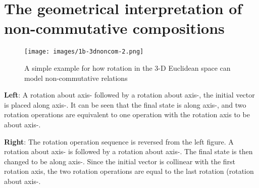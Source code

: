\documentclass[11pt]{article}
\begin{document}
\appendix

\section{The geometrical interpretation of non-commutative compositions}

\begin{figure}[!ht]
\centering     \texttt{[image: images/1b-3dnoncom-2.png]}
\caption{A simple example for how rotation in the 3-D Euclidean space can model non-commutative relations}
\label{simple example for how rotation in 3D-Euclidean space can model non-commutative relations}
\end{figure}

\textbf{Left}: A rotation about axis- followed by a rotation about axis-, the initial vector  is placed along axis-. It can be seen that the final state is along axis-, and two rotation operations are equivalent to one operation with the rotation axis to be about axis-.

\textbf{Right}: The rotation operation sequence is reversed from the left figure. A rotation about axis- is followed by a rotation about axis-. The final state is then changed to be along axis-. Since the initial vector is collinear with the first rotation axis, the two rotation operations are equal to the last rotation (rotation about axis-. 
\end{document}
